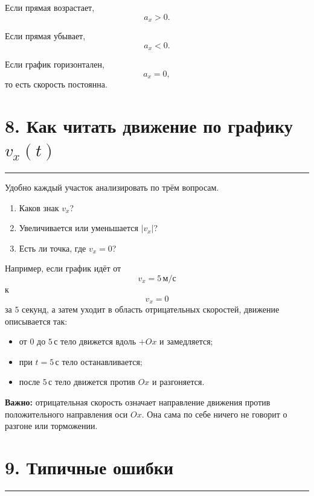 \documentclass[a4paper,12pt]{article}
\newcommand{\sectionline}{%
  \par\vspace{-0.5em}%
  \noindent\textcolor{accent}{\rule{\linewidth}{0.7pt}}%
  \par\vspace{0.5em}%
}
\newcommand{\key}[1]{\textcolor{darkaccent}{\textbf{#1}}}
\begin{document}
Если прямая возрастает,
\[
  a_x>0.
\]

Если прямая убывает,
\[
  a_x<0.
\]

Если график горизонтален,
\[
  a_x=0,
\]
то есть скорость постоянна.


\section*{8. Как читать движение по графику \(v_x(t)\)}
\sectionline

Удобно каждый участок анализировать по трём вопросам.

\begin{enumerate}
  \item Каков знак \(v_x\)?
  \item Увеличивается или уменьшается \(|v_x|\)?
  \item Есть ли точка, где \(v_x=0\)?
\end{enumerate}

Например, если график идёт от
\[
  v_x=5\,\text{м}/\text{с}
\]
к
\[
  v_x=0
\]
за \(5\) секунд, а затем уходит в область отрицательных скоростей, движение описывается так:

\begin{itemize}
  \item от \(0\) до \(5\,\text{с}\) тело движется вдоль \(+Ox\) и замедляется;

  \item при \(t=5\,\text{с}\) тело останавливается;

  \item после \(5\,\text{с}\) тело движется против \(Ox\) и разгоняется.
\end{itemize}

\key{Важно:}
отрицательная скорость означает направление движения против положительного направления оси \(Ox\). Она сама по себе ничего не говорит о разгоне или торможении.


\section*{9. Типичные ошибки}
\sectionline
\end{document}
